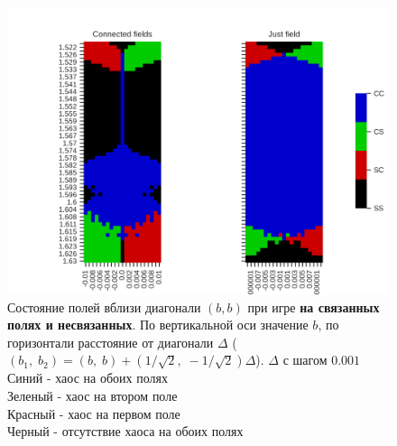 \documentclass[12pt]{article}
\begin{document}
        \begin{figure}[H]
            \centering
            \includegraphics[width=0.95\columnwidth, keepaspectratio=True]{DoubleField/double_field_state_comparasion.png}
            \caption{Состояние полей вблизи диагонали $(b, b)$ при игре \textbf{на связанных полях и несвязанных}. По вертикальной оси значение $b$, по горизонтали расстояние от диагонали $\Delta$ ($(b_1,\;b_2) = (b,\;b) + (1/\sqrt{2},\;-1/\sqrt{2})\Delta$). $\Delta$ с шагом $0.001$\\
            Синий - хаос на обоих полях\\
            Зеленый - хаос на втором поле\\
            Красный - хаос на первом поле\\
            Черный - отсутствие хаоса на обоих полях}
            \label{fig:chaos_states}
        \end{figure}
        
\end{document}
